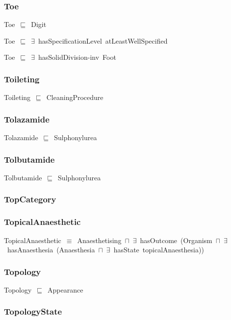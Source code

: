 \documentclass{article}
\begin{document}
\subsubsection*{Toe}

Toe~\ensuremath{\sqsubseteq}~Digit~

Toe~\ensuremath{\sqsubseteq}~\ensuremath{\exists}~hasSpecificationLevel~atLeastWellSpecified~

Toe~\ensuremath{\sqsubseteq}~\ensuremath{\exists}~hasSolidDivision-inv~Foot~

\subsubsection*{Toileting}

Toileting~\ensuremath{\sqsubseteq}~CleaningProcedure~

\subsubsection*{Tolazamide}

Tolazamide~\ensuremath{\sqsubseteq}~Sulphonylurea~

\subsubsection*{Tolbutamide}

Tolbutamide~\ensuremath{\sqsubseteq}~Sulphonylurea~

\subsubsection*{TopCategory}

\subsubsection*{TopicalAnaesthetic}

TopicalAnaesthetic~\ensuremath{\equiv}~Anaesthetising~\ensuremath{\sqcap}~\ensuremath{\exists}~hasOutcome~(Organism~\ensuremath{\sqcap}~\ensuremath{\exists}~hasAnaesthesia~(Anaesthesia~\ensuremath{\sqcap}~\ensuremath{\exists}~hasState~topicalAnaesthesia))

\subsubsection*{Topology}

Topology~\ensuremath{\sqsubseteq}~Appearance~

\subsubsection*{TopologyState}
\end{document}
